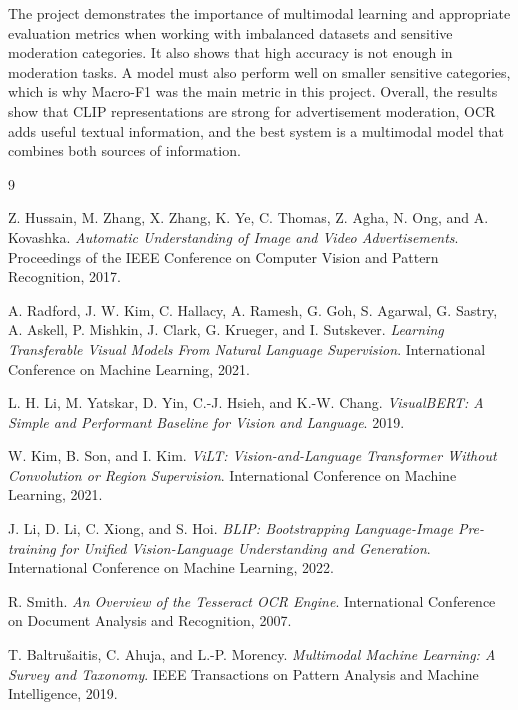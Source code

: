 \documentclass[12pt]{article}
\begin{document}
The project demonstrates the importance of multimodal learning and appropriate evaluation metrics when working with imbalanced datasets and sensitive moderation categories. It also shows that high accuracy is not enough in moderation tasks. A model must also perform well on smaller sensitive categories, which is why Macro-F1 was the main metric in this project. Overall, the results show that CLIP representations are strong for advertisement moderation, OCR adds useful textual information, and the best system is a multimodal model that combines both sources of information.

\begin{thebibliography}{9}

Z. Hussain, M. Zhang, X. Zhang, K. Ye, C. Thomas, Z. Agha, N. Ong, and A. Kovashka.
\textit{Automatic Understanding of Image and Video Advertisements}.
Proceedings of the IEEE Conference on Computer Vision and Pattern Recognition, 2017.

A. Radford, J. W. Kim, C. Hallacy, A. Ramesh, G. Goh, S. Agarwal, G. Sastry, A. Askell, P. Mishkin, J. Clark, G. Krueger, and I. Sutskever.
\textit{Learning Transferable Visual Models From Natural Language Supervision}.
International Conference on Machine Learning, 2021.

L. H. Li, M. Yatskar, D. Yin, C.-J. Hsieh, and K.-W. Chang.
\textit{VisualBERT: A Simple and Performant Baseline for Vision and Language}.
2019.

W. Kim, B. Son, and I. Kim.
\textit{ViLT: Vision-and-Language Transformer Without Convolution or Region Supervision}.
International Conference on Machine Learning, 2021.

J. Li, D. Li, C. Xiong, and S. Hoi.
\textit{BLIP: Bootstrapping Language-Image Pre-training for Unified Vision-Language Understanding and Generation}.
International Conference on Machine Learning, 2022.

R. Smith.
\textit{An Overview of the Tesseract OCR Engine}.
International Conference on Document Analysis and Recognition, 2007.

T. Baltru\v{s}aitis, C. Ahuja, and L.-P. Morency.
\textit{Multimodal Machine Learning: A Survey and Taxonomy}.
IEEE Transactions on Pattern Analysis and Machine Intelligence, 2019.

\end{thebibliography}
\end{document}
